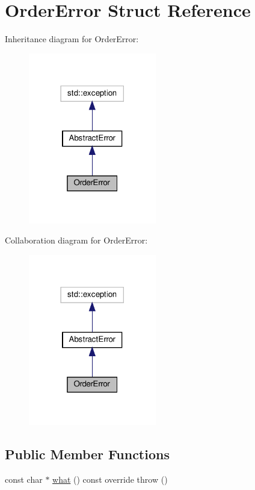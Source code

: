 \hypertarget{structOrderError}{}\section{Order\+Error Struct Reference}
\label{structOrderError}


Inheritance diagram for Order\+Error\+:\nopagebreak
\begin{figure}[H]
\begin{center}
\leavevmode
\includegraphics[width=158pt]{structOrderError__inherit__graph}
\end{center}
\end{figure}


Collaboration diagram for Order\+Error\+:\nopagebreak
\begin{figure}[H]
\begin{center}
\leavevmode
\includegraphics[width=158pt]{structOrderError__coll__graph}
\end{center}
\end{figure}
\subsection*{Public Member Functions}
\begin{DoxyCompactItemize}
\item 
const char $\ast$ \hyperlink{structOrderError_a55140961b8a995ff9111a275cac708c8}{what} () const override  throw ()
\end{DoxyCompactItemize}


